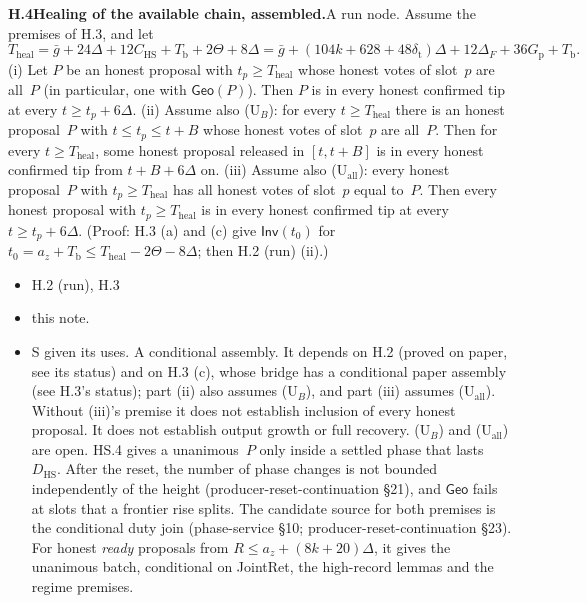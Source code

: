 \documentclass{article}
\newcommand{\dagnode}[6]{%
\par\medskip\noindent\textbf{#1\enspace #2.}\enspace #3
\begin{itemize}[leftmargin=2.2em,itemsep=0pt,topsep=2pt]
\item[\emph{Uses}] #4
\item[\emph{Evid.}] #5
\item[\emph{Task}] #6
\end{itemize}}
\begin{document}
\dagnode{H.4}{Healing of the available chain, assembled}{A run node.
Assume the premises of H.3, and let
\[
T_{\mathrm{heal}}=\bar g+24\Delta+12C_{\mathrm{HS}}+T_{\mathrm b}+2\Theta+8\Delta
=\bar g+(104k+628+48\delta_{\mathrm t})\Delta+12\Delta_F+36G_{\mathrm p}
+T_{\mathrm b}.
\]
(i) Let $P$ be an honest proposal with $t_p\geq T_{\mathrm{heal}}$ whose
honest votes of slot~$p$ are all~$P$ (in particular, one with
$\mathsf{Geo}(P)$).  Then $P$ is in every honest confirmed tip at every
$t\geq t_p+6\Delta$.
(ii) Assume also ($\mathrm U_{B}$): for every $t\geq T_{\mathrm{heal}}$ there
is an honest proposal~$P$ with $t\leq t_p\leq t+B$ whose honest votes of
slot~$p$ are all~$P$.  Then for every $t\geq T_{\mathrm{heal}}$, some honest
proposal released in $[t,t+B]$ is in every honest confirmed tip from
$t+B+6\Delta$ on.
(iii) Assume also ($\mathrm U_{\mathrm{all}}$): every honest proposal~$P$
with $t_p\geq T_{\mathrm{heal}}$ has all honest votes of slot~$p$ equal
to~$P$.  Then every honest proposal with $t_p\geq T_{\mathrm{heal}}$ is in
every honest confirmed tip at every $t\geq t_p+6\Delta$.
(Proof: H.3 (a) and (c) give $\mathsf{Inv}(t_0)$ for
$t_0=a_z+T_{\mathrm b}\leq T_{\mathrm{heal}}-2\Theta-8\Delta$; then H.2 (run)
(ii).)}
{H.2 (run), H.3}
{this note.}
{S given its uses.  A conditional assembly.  It depends on H.2 (proved on
paper, see its status) and on H.3 (c), whose bridge has a conditional paper
assembly (see H.3's status); part (ii) also assumes ($\mathrm U_{B}$), and part (iii)
assumes ($\mathrm U_{\mathrm{all}}$).  Without (iii)'s premise it does not
establish inclusion of every honest proposal.  It does not establish output
growth or full recovery.
($\mathrm U_{B}$) and ($\mathrm U_{\mathrm{all}}$) are open.  HS.4 gives a
unanimous~$P$ only inside a settled phase that lasts $D_{\mathrm{HS}}$.
After the reset, the number of phase changes is not bounded independently of
the height (producer-reset-continuation \S21), and $\mathsf{Geo}$ fails at
slots that a frontier rise splits.  The candidate source for both premises is
the conditional duty join (phase-service \S10; producer-reset-continuation
\S23).  For honest \emph{ready} proposals from
$R\leq a_z+(8k+20)\Delta$, it gives the unanimous batch, conditional on
JointRet, the high-record lemmas and the regime premises.}
\end{document}
